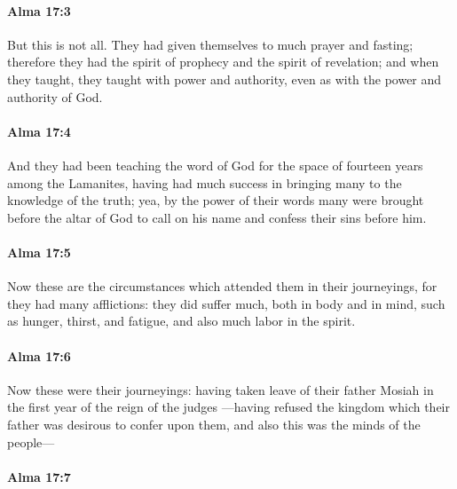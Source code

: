 		\paragraph{Alma 17:3} %
			\label{ALMA-17-3}

			But this is not all.
			They had given themselves to much prayer and fasting;
			therefore they had the spirit of prophecy and the spirit of revelation;
			and when they taught, they taught with power and authority,
			even as with the power and authority of God.

		\paragraph{Alma 17:4} %
			\label{ALMA-17-4}

			And they had been teaching the word of God
			for the space of fourteen years among the Lamanites,
			having had much success in bringing many to the knowledge of the truth;
			yea, by the power of their words many were brought before the altar of God
			to call on his name and confess their sins before him.

		\paragraph{Alma 17:5} %
			\label{ALMA-17-5}

			Now these are the circumstances which attended them in their journeyings,
			for they had many afflictions:
			they did suffer much, both in body and in mind,
			such as hunger, thirst, and fatigue, and also much labor in the spirit.

		\paragraph{Alma 17:6} %
			\label{ALMA-17-6}

			Now these were their journeyings:
			having taken leave of their father Mosiah
			in the first year of the reign of the judges
			---having refused the kingdom which their father was desirous to confer upon them,
			and also this was the minds of the people---

		\paragraph{Alma 17:7} %
			\label{ALMA-17-7}

